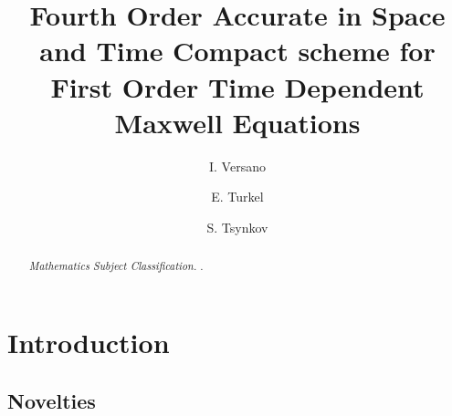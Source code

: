 \documentclass[12pt,reqno]{amsart}
\theoremstyle{definition}
\numberwithin{equation}{section}
\begin{document}
	
	
	\title{Fourth Order Accurate in Space and Time Compact scheme for First Order Time Dependent Maxwell Equations}
	
	\author {I. Versano}
	
	\address {School of Mathematical Sciences, Tel-Aviv University, Tel-Aviv 6997801, Israel}
	
	
	\author {E. Turkel}
	
	\address {School of Mathematical Sciences, Tel-Aviv University, Tel-Aviv 6997801, Israel}
	
	
	\author {S. Tsynkov }
	
	\address {North Carolina State University, Box 8205, Raleigh, NC 27695, USA.}
	
	
	
	
	
	
	
	
	
	\maketitle
	\begin{abstract}
		
		
		\medskip
		
		  \! {\em Mathematics  Subject  Classification.}
		.\\[1mm]
	\end{abstract}
	
	\section{Introduction}
	
	\subsection{Novelties}
\end{document}
